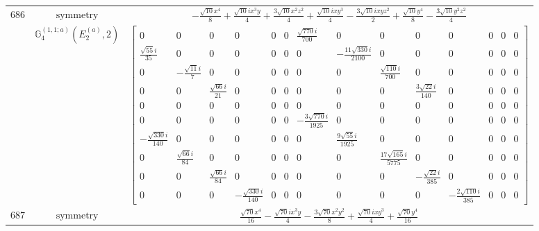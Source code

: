 \documentclass[fleqn,8pt,landscape]{jsarticle}
\begin{document}
\begin{longtable}{ccc}
$ 686 $ & $ \text{symmetry} $ & $ - \frac{\sqrt{10} x^{4}}{8} + \frac{\sqrt{10} i x^{3} y}{4} + \frac{3 \sqrt{10} x^{2} z^{2}}{4} + \frac{\sqrt{10} i x y^{3}}{4} - \frac{3 \sqrt{10} i x y z^{2}}{2} + \frac{\sqrt{10} y^{4}}{8} - \frac{3 \sqrt{10} y^{2} z^{2}}{4} $ \\
$  $ & $ \mathbb{G}_{4}^{(1,1;a)}(E_{2}^{(a)},2) $ & $ \begin{bmatrix} 0 & 0 & 0 & 0 & 0 & 0 & \frac{\sqrt{770} i}{700} & 0 & 0 & 0 & 0 & 0 & 0 & 0 \\ \frac{\sqrt{55} i}{35} & 0 & 0 & 0 & 0 & 0 & 0 & - \frac{11 \sqrt{330} i}{2100} & 0 & 0 & 0 & 0 & 0 & 0 \\ 0 & - \frac{\sqrt{11} i}{7} & 0 & 0 & 0 & 0 & 0 & 0 & \frac{\sqrt{110} i}{700} & 0 & 0 & 0 & 0 & 0 \\ 0 & 0 & \frac{\sqrt{66} i}{21} & 0 & 0 & 0 & 0 & 0 & 0 & \frac{3 \sqrt{22} i}{140} & 0 & 0 & 0 & 0 \\ 0 & 0 & 0 & 0 & 0 & 0 & 0 & 0 & 0 & 0 & 0 & 0 & 0 & 0 \\ 0 & 0 & 0 & 0 & 0 & 0 & - \frac{3 \sqrt{770} i}{1925} & 0 & 0 & 0 & 0 & 0 & 0 & 0 \\ - \frac{\sqrt{330} i}{140} & 0 & 0 & 0 & 0 & 0 & 0 & \frac{9 \sqrt{55} i}{1925} & 0 & 0 & 0 & 0 & 0 & 0 \\ 0 & \frac{\sqrt{66} i}{84} & 0 & 0 & 0 & 0 & 0 & 0 & \frac{17 \sqrt{165} i}{5775} & 0 & 0 & 0 & 0 & 0 \\ 0 & 0 & \frac{\sqrt{66} i}{84} & 0 & 0 & 0 & 0 & 0 & 0 & - \frac{\sqrt{22} i}{385} & 0 & 0 & 0 & 0 \\ 0 & 0 & 0 & - \frac{\sqrt{330} i}{140} & 0 & 0 & 0 & 0 & 0 & 0 & - \frac{2 \sqrt{110} i}{385} & 0 & 0 & 0 \end{bmatrix} $ \\ \hline
$ 687 $ & $ \text{symmetry} $ & $ \frac{\sqrt{70} x^{4}}{16} - \frac{\sqrt{70} i x^{3} y}{4} - \frac{3 \sqrt{70} x^{2} y^{2}}{8} + \frac{\sqrt{70} i x y^{3}}{4} + \frac{\sqrt{70} y^{4}}{16} $ \\

\end{longtable}
\end{document}
